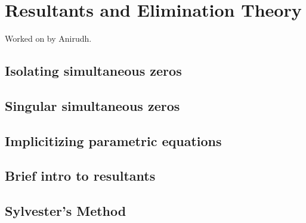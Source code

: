\chapter{Resultants and Elimination Theory}


Worked on by Anirudh.

\section{Isolating simultaneous zeros}

\section{Singular simultaneous zeros}

\section{Implicitizing parametric equations}

\section{Brief intro to resultants}

\section{Sylvester's Method}

